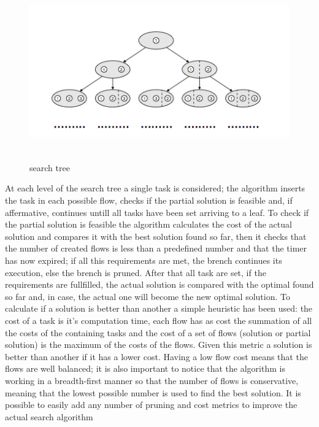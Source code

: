 \documentclass[a4paper,11pt,oneside]{book}
\begin{document}
\begin{figure}[ht!]
\centering
\includegraphics[width = 130mm, height = 76mm]{search_tree.png}
\caption{search tree}
\label{search_tree}
\end{figure}

At each level of the search tree a single task is considered; the algorithm inserts the task in each possible flow, checks if the partial solution is feasible and, if affermative, continues untill all tasks have been set arriving to a leaf. To check if the partial solution is feasible the algorithm calculates the cost of the actual solution and compares it with the best solution found so far, then it checks that the number of created flows is less than a predefined number and that the timer has now expired; if all this requirements are met, the brench continues its execution, else the brench is pruned. After that all task are set, if the requirements are fullfilled, the actual solution is compared with the optimal found so far and, in case, the actual one will become the new optimal solution. To calculate if a solution is better than another a simple heuristic has been used: the cost of a task is it's computation time, each flow has as cost the summation of all the costs of the containing tasks and the cost of a set of flows (solution or partial solution) is the maximum of the costs of the flows. Given this metric a solution is better than another if it has a lower cost. Having a low flow cost means that the flows are well balanced; it is also important to notice that the algorithm is working in a \emph{}breadth-first manner so that the number of flows is conservative, meaning that the lowest possible number is used to find the best solution. It is possible to easily add any number of pruning and cost metrics to improve the actual search algorithm
\end{document}
